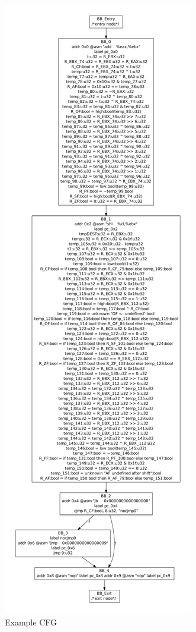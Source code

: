 \begin{figure}[!p]
  \begin{center}
    \includegraphics[height=.9\textheight]{chap-examples/cfg.pdf}
  \end{center}
  \caption{Example CFG}
  \label{fig:cfg}
\end{figure}

